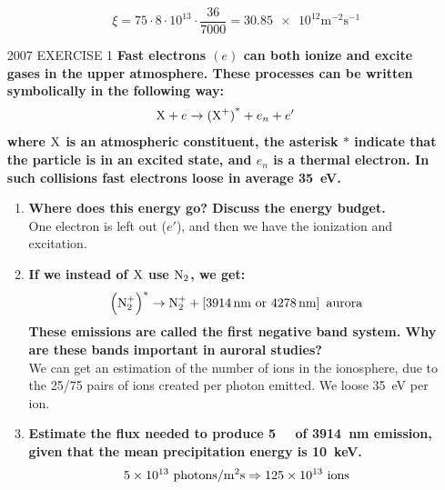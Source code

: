 \begin{enumerate}
\begin{enumerate}
        \begin{equation*}
            \xi=75\cdot 8\cdot 10^{13}\cdot\frac{36}{7000}=\num{30.85e12}\si{\metre^{-2}\second^{-1}}
        \end{equation*}
    \end{enumerate}
    \item [2007 EXERCISE 1] \textbf{Fast electrons \((e)\) can both ionize and excite gases in the upper atmosphere. These processes can be written symbolically in the following way:}
    \begin{equation*}
        \textnormal{X}+e\rightarrow {(\textnormal{X}^+)}^*+e_n+e'
    \end{equation*}
    \textbf{where \(\textnormal{X}\) is an atmospheric constituent, the asterisk \(*\) indicate that the particle is in an excited state, and \(e_n\) is a thermal electron. In such collisions fast electrons loose in average \SI{35}{\electronvolt}.}
    \begin{enumerate}
        \item \textbf{Where does this energy go? Discuss the energy budget.}\\ One electron is left out (\(e'\)), and then we have the ionization and excitation.
        \item \textbf{If we instead of \(\textnormal{X}\) use \(\textnormal{N}_2\), we get:}
        \begin{equation*}
            {\left(\textnormal{N}_2^+\right)}^*\rightarrow \textnormal{N}_2^++\left[\SI{3914}{\nano\metre}\textnormal{ or }\SI{4278}{\nano\metre}\right]\textnormal{ aurora}
        \end{equation*}
        \textbf{These emissions are called the first negative band system. Why are these bands important in auroral studies?}\\ We can get an estimation of the number of ions in the ionosphere, due to the 25/75 pairs of ions created per photon emitted. We loose \SI{35}{\electronvolt} per ion.
        \item \textbf{Estimate the flux needed to produce \SI{5}{\kilo\ray} of \SI{3914}{\nano\metre} emission, given that the mean precipitation energy is \SI{10}{\kilo\electronvolt}.}\\
        \begin{align*}
            \num{5e13}\tn{ photons/}\si{\metre^2\second}\Rightarrow\num{125e13}\tn{ ions}\\

\end{align*}
\end{enumerate}
\end{enumerate}

